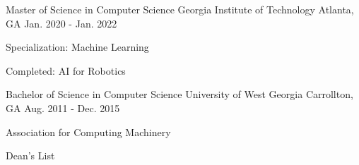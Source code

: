 
\begin{cventries}
  \cventry
    {Master of Science in Computer Science} %
    {Georgia Institute of Technology} %
    {Atlanta, GA} %
    {Jan. 2020 - Jan. 2022} %
    {
      \begin{cvitems} %
         \item {Specialization: Machine Learning}
         \item {Completed: AI for Robotics}
      \end{cvitems}
    }
    
  \cventry
    {Bachelor of Science in Computer Science} %
    {University of West Georgia} %
    {Carrollton, GA} %
    {Aug. 2011 - Dec. 2015} %
    {
      \begin{cvitems} %
         \item {Association for Computing Machinery}
         \vspace{0.5mm}
         \item {Dean's List}
      \end{cvitems}
    }
\end{cventries}
